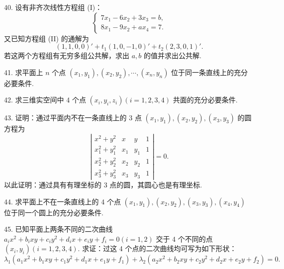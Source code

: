 \documentclass[UTF8, 12pt, fontset=fandol, oneside]{ctexart}
\begin{document}
40. 设有非齐次线性方程组 (I)：
\[
\left\{\begin{array}{r}
7x_1-6x_2+3x_3=b,\\
8x_1-9x_2+ax_4=7.
\end{array}\right.
\]
又已知方程组 (II) 的通解为
\[
(1,1,0,0)'+t_1(1,0,-1,0)'+t_2(2,3,0,1)'.
\]
若这两个方程组有无穷多组公共解，求出 $a,b$ 的值并求出公共解.

41. 求平面上 $n$ 个点 $(x_1,y_1),(x_2,y_2),\cdots,(x_n,y_n)$ 位于同一条直线上的充分必要条件.

42. 求三维实空间中 4 个点 $(x_i,y_i,z_i)(i=1,2,3,4)$ 共面的充分必要条件.

43. 证明：通过平面内不在一条直线上的 3 点 $(x_1,y_1),(x_2,y_2),(x_3,y_3)$ 的圆方程为
\[
\left|\begin{array}{cccc}
x^2+y^2&x&y&1\\
x_1^2+y_1^2&x_1&y_1&1\\
x_2^2+y_2^2&x_2&y_2&1\\
x_3^2+y_3^2&x_3&y_3&1
\end{array}\right|=0.
\]
以此证明：通过具有有理坐标的 3 点的圆，其圆心也是有理坐标.

44. 求平面上不在一条直线上的 4 个点 $(x_1,y_1),(x_2,y_2),(x_3,y_3),(x_4,y_4)$ 位于同一个圆上的充分必要条件.

45. 已知平面上两条不同的二次曲线 $a_ix^2+b_ixy+c_iy^2+d_ix+e_iy+f_i=0(i=1,2)$ 交于 4 个不同的点 $(x_i,y_i)(i=1,2,3,4)$. 求证：过这 4 个点的二次曲线均可写为如下形状：
\[
\lambda_1(a_1x^2+b_1xy+c_1y^2+d_1x+e_1y+f_1)+\lambda_2(a_2x^2+b_2xy+c_2y^2+d_2x+e_2y+f_2)=0.
\]
\end{document}
